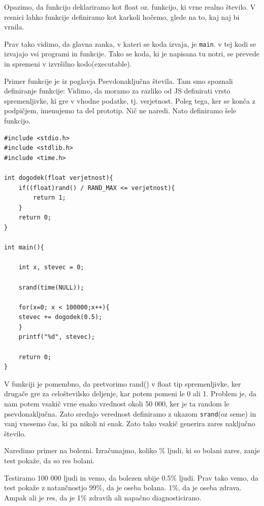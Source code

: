 \documentclass[a4paper, 12pt]{article}
\begin{document}
Opazimo, da funkcijo deklariramo kot float oz. funkcijo, ki vrne realno število. V resnici lahko funkcije definiramo kot karkoli hočemo, glede na to, kaj naj bi vrnila.

Prav tako vidimo, da glavna zanka, v kateri se koda izvaja, je \texttt{main}. v tej kodi se izvajajo vsi programi in funkcije. Tako se koda, ki je napisana tu notri, se prevede in spremeni v izvršilno kodo(executable).

Primer funkcije je iz poglavja Psevdonaključna števila. Tam smo spoznali definiranje funkcije:
 Vidimo, da moramo za razliko od JS definirati vrsto spremenljivke, ki gre v vhodne podatke, tj. verjetnost. Poleg tega, ker se konča z podpičjem, imenujemo ta del prototip. Nič ne naredi. Nato definiramo šele funkcijo.

\begin{lstlisting}[caption = Naključnost s funkcijo srand in brez]
#include <stdio.h>
#include <stdlib.h>
#include <time.h>

int dogodek(float verjetnost){
	if((float)rand() / RAND_MAX <= verjetnost){
		return 1;
	}
	return 0;
}

int main(){

	int x, stevec = 0;
	
	srand(time(NULL));
	
	for(x=0; x < 100000;x++){
	stevec += dogodek(0.5);
	}
	printf("%d", stevec);
	
	return 0;
}
\end{lstlisting}

V funkciji je pomembno, da pretvorimo rand() v float tip spremenljivke, ker drugače gre za celoštevilsko deljenje, kar potem pomeni le 0 ali 1. Problem je, da nam potem vsakič vrne enako vrednost okoli 50 000, ker je ta random le psevdonaključna. Zato srednjo verednost definiramo z ukazom \texttt{srand}(oz seme) in vanj vnesemo čas, ki pa nikoli ni enak. Zato tako vsakič generira zares naključno število.

Naredimo primer na bolezni. Izračunajmo, koliko \% ljudi, ki so bolani zares, zanje test pokaže, da so res bolani.

Testiramo 100 000 ljudi in vemo, da bolezen ubije 0.5\% ljudi. Prav tako vemo, da test pokaže z natančnostjo 99\%, da je oseba bolana. 1\%, da je oseba zdrava. Ampak ali je res, da je 1\% zdravih ali napačno diagnosticirano.
\end{document}

